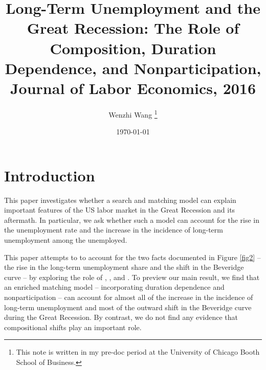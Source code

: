 \documentclass[12pt]{article}
\newcommand{\highlightO}[1]{{\emph{\color{MyOrange}{#1}}}}
\theoremstyle{definition}
\begin{document}
 



\title{\bf Long-Term Unemployment and the Great Recession: The Role of Composition, Duration Dependence, and Nonparticipation, Journal of Labor Economics, 2016}
\author{Wenzhi Wang \thanks{This note is written in my pre-doc period at the University of Chicago Booth School of Business.} } 
\date{\today}
\maketitle

\citet{kroftLongTermUnemploymentGreat2016}


\section{Introduction}

This paper investigates whether a search and matching model can explain important features of the US labor market in the Great Recession and its aftermath. In particular, we ask whether such a model can account for the rise in the unemployment rate and the increase in the incidence of long-term unemployment among the unemployed. 

This paper attempts to to account for the two facts documented in Figure \ref{fig2} -- the rise in the long-term unemployment share and the shift in the Beveridge curve -- by exploring the role of \highlightO{shifts in the composition of the unemployed}, \highlightO{duration dependence in job finding rates for the unemployed}, and \highlightO{transitions in and out of the labor force (between unemployment, employment, and nonparticipation)}. To preview our main result, we find that an enriched matching model -- incorporating duration dependence and nonparticipation -- can account for almost all of the increase in the incidence of long-term unemployment and most of the outward shift  in the Beveridge curve during the Great Recession. By contrast, we do not find any evidence that compositional shifts play an important role. 
\end{document}
